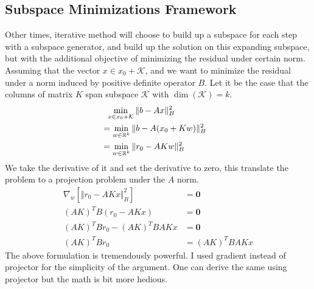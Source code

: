 \documentclass[]{article}
\theoremstyle{definition}
\begin{document}
    \subsection{Subspace Minimizations Framework}\label{sec:1.4}
        Other times, iterative method will choose to build up a subspace for each step with a subspace generator, and build up the solution on this expanding subspace, but with the additional objective of minimizing the residual under certain norm. Assuming that the vector $x\in x_0 + \mathcal{K}$, and we want to minimize the residual under a norm induced by positive definite operator $B$. Let it be the case that the columns of matrix $K$ span subspace $\mathcal{K}$ with $\dim(\mathcal K) = k$. 
        \begin{align}
            &\hspace{0.6em} \min_{x\in x_0 + \mathcal{K}} \Vert b - Ax\Vert_B^2 
            \\
            &= \min_{w\in \mathbb{R}^{k}} 
            \Vert b - A(x_0 + Kw)\Vert_B^2 & 
            \\
            &= \min_{w\in \mathbb{R}^{k}} 
            \Vert 
                r_0 - AKw
            \Vert_B^2
        \end{align}
        We take the derivative of it and set the derivative to zero, this translate the problem to a projection problem under the $A$ norm. 
        \begin{align}
            \nabla_w \left[
                \Vert r_0 - AKx\Vert_B^2
            \right] &= \mathbf{0}
            \\
            (AK)^TB(r_0 - AKx) &= \mathbf{0}
            \\
            (AK)^TBr_0 - (AK)^TBAKx &= \mathbf{0}
            \\
            (AK)^TBr_0 &= (AK)^TBAKx
        \end{align}
        The above formulation is tremendously powerful. I used gradient instead of projector for the simplicity of the argument. One can derive the same using projector but the math is bit more hedious. 
\end{document}
